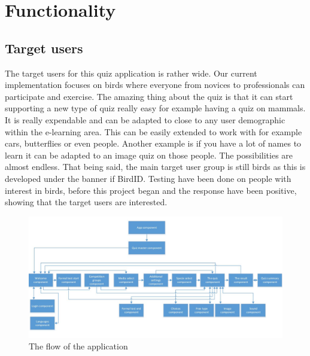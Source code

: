 \chapter{Functionality}
\label{chap:functionality}


\section{Target users}
\label{sec:targetusers}
The target users for this quiz application is rather wide. Our current implementation focuses on birds where everyone from novices to professionals  can participate and exercise. The amazing thing about the quiz is that it can start supporting a new type of quiz really easy for example having a quiz on mammals. It is really expendable and can be adapted to close to any user demographic within the e-learning area. This can be easily extended to work with for example cars, butterflies or even people. Another example is if you have a lot of names to learn it can be adapted to an image quiz on those people. The possibilities are almost endless. That being said, the main target user group is still birds as this is developed under the banner if BirdID. Testing have been done on people with interest in birds, before this project began and the response have been positive, showing that the target users are interested.



\begin{figure}[h]
  \centering
  \includegraphics[width=1.0\textwidth]{figures/user_prespective_new.jpg}
  \caption[userPrespective]{The flow of the application }
  \label{fig:userPrespective}
\end{figure}

